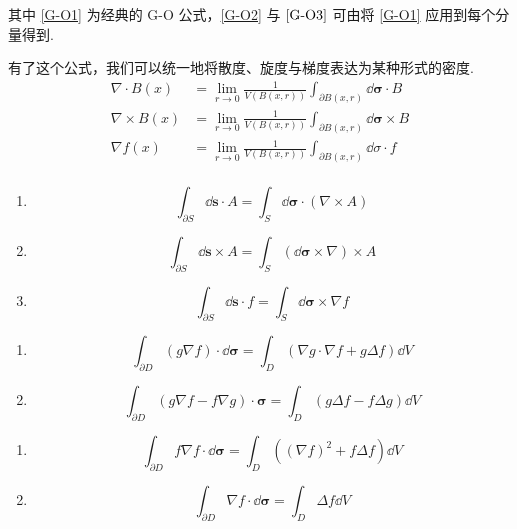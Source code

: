 其中 \ref{G-O1} 为经典的 G-O 公式，\ref{G-O2} 与 $\ref{G-O3}$ 可由将 \ref{G-O1} 应用到每个分量得到.

有了这个公式，我们可以统一地将散度、旋度与梯度表达为某种形式的密度.
$$
\begin{aligned}
    \nabla\cdot B(x)&=\lim_{r\to 0}\frac{1}{V(B(x,r))}\int_{\partial B(x,r)}\dd\bm{\sigma}\cdot B\\
    \nabla\times B(x)&=\lim_{r\to 0}\frac{1}{V(B(x,r))}\int_{\partial B(x,r)}\dd\bm{\sigma}\times B\\
    \nabla f(x)&=\lim_{r\to 0}\frac{1}{V(B(x,r))}\int_{\partial B(x,r)}\dd\sigma\cdot f\\
\end{aligned}
$$


\begin{property}
    \begin{enumerate}
        \item 
$$
\int_{\partial S}\dd\bm{s}\cdot A=\int_S\dd\bm{\sigma}\cdot(\nabla\times A)
$$

        \item 
$$
\int_{\partial S}\dd\bm{s}\times A=\int_S(\dd\bm{\sigma}\times \nabla)\times A
$$

        \item 
$$
\int_{\partial S}\dd\bm{s}\cdot f=\int_S\dd\bm{\sigma}\times\nabla f
$$
    \end{enumerate}
\end{property}


\begin{property}
    \begin{enumerate}
        \item 
$$
\int_{\partial D}(g\nabla f)\cdot\dd\bm{\sigma}=\int_D(\nabla g\cdot\nabla f+g\Delta f)\dd V
$$

        \item 
$$
\int_{\partial D}(g\nabla f-f\nabla g)\cdot\bm{\sigma}=\int_D(g\Delta f-f\Delta g)\dd V
$$
    \end{enumerate}
\end{property}

\begin{inference}
    \begin{enumerate}
        \item 
$$
\int_{\partial D}f\nabla f\cdot\dd\bm{\sigma}=\int_D((\nabla f)^2+f\Delta f)\dd V
$$

        \item 
$$
\int_{\partial D}\nabla f\cdot\dd\bm{\sigma}=\int_D\Delta f\dd V
$$
    \end{enumerate}
\end{inference}